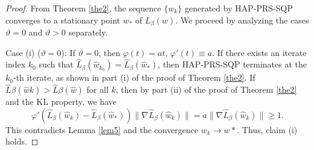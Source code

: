 \documentclass[pdflatex,sn-mathphys-num]{sn-jnl}%
\theoremstyle{thmstyleone}%
\theoremstyle{thmstyletwo}%
\theoremstyle{thmstylethree}%
\begin{document}
\begin{proof}
From Theorem \ref{the2}, the sequence $\{w_k\}$ generated by HAP-PRS-SQP converges to a stationary point $w_*$ of $L_{\beta}(w)$. We proceed by analyzing the cases $\vartheta = 0$ and $\vartheta > 0$ separately.

Case (i) ($\vartheta = 0$):  
If $\vartheta=0$, then $\varphi(t)=at$, $\varphi'(t)\equiv a$. If there exists an iterate index $k_{0}$ such that $\hat{L}_\beta(\hat{w}_{k_{0}})= \hat{L}_\beta(\hat{w}_{*})$, then HAP-PRS-SQP terminates at the $k_0$-th iterate, as shown in part (i) of the proof of Theorem \ref{the2}. If $\hat{L}\beta(\hat{w}k) > \hat{L}\beta(\hat{w})$ for all $k$, then by part (ii) of the proof of Theorem \ref{the2} and the KL property, we have 
\[\varphi ' (\hat{L}_{\beta}(\hat{w}_{k})-\hat{L}_{\beta}(\hat{w}_{*}))\|\nabla\hat{L}_{\beta}(\hat{w}_{k})\|=a\|\nabla\hat{L}_{\beta}(\hat{w}_{k})\|\geq 1.\]
This contradicts Lemma \ref{lem5} and the convergence $w_k \to w*$. Thus, claim (i) holds.


\end{proof}
\end{document}
